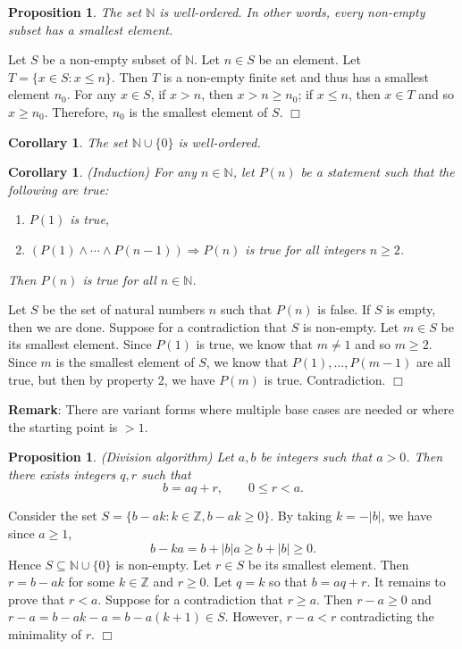 \documentclass{article}
\def\Z{{\mathbb Z}}
\def\N{{\mathbb N}}
\def\Z{{\mathbb Z}}
\newtheorem{cor}[subsection]{Corollary}
\newtheorem{proposition}[subsection]{Proposition}
\newenvironment{proof}{\noindent {\bf Proof:}}{$\Box$ \vspace{2 ex}}
\begin{document}
\begin{proposition}
The set $\N$ is well-ordered. In other words, every non-empty subset has a smallest element.
\end{proposition}

\begin{proof}
    Let $S$ be a non-empty subset of $\N$. Let $n\in S$ be an element. Let $T = \{x\in S\colon x \leq n\}$. Then $T$ is a non-empty finite set and thus has a smallest element $n_0$. For any $x\in S$, if $x>n$, then $x>n\geq n_0$; if $x\leq n$, then $x\in T$ and so $x\geq n_0$. Therefore, $n_0$ is the smallest element of $S$.
\end{proof}

\begin{cor}
The set $\N\cup\{0\}$ is well-ordered.
\end{cor}

\begin{cor}
    (Induction) For any $n\in\N$, let $P(n)$ be a statement such that the following are true:
    \begin{enumerate}
        \item $P(1)$ is true,
        \item $(P(1)\wedge\cdots\wedge P(n-1))\Rightarrow P(n)$ is true for all integers $n\geq2$.
    \end{enumerate}
    Then $P(n)$ is true for all $n\in\N$.
\end{cor}

\begin{proof}
    Let $S$ be the set of natural numbers $n$ such that $P(n)$ is false. If $S$ is empty, then we are done. Suppose for a contradiction that $S$ is non-empty. Let $m\in S$ be its smallest element. Since $P(1)$ is true, we know that $m\neq 1$ and so $m\geq2$. Since $m$ is the smallest element of $S$, we know that $P(1),\ldots,P(m-1)$ are all true, but then by property 2, we have $P(m)$ is true. Contradiction.
\end{proof}

\noindent\textbf{Remark}: There are variant forms where multiple base cases are needed or where the starting point is $>1$.

\begin{proposition}
    (Division algorithm) Let $a,b$ be integers such that $a>0$. Then there exists integers $q,r$ such that $$b = aq + r,\qquad 0\leq r < a.$$
\end{proposition}

\begin{proof}
    Consider the set $S = \{b - ak\colon k\in\Z, b - ak\geq 0\}$. By taking $k = -|b|$, we have since $a\geq 1$,
    $$b - ka = b + |b|a \geq b + |b| \geq 0.$$
    Hence $S\subseteq \N\cup\{0\}$ is non-empty. Let $r\in S$ be its smallest element. Then $r = b - ak$ for some $k\in\Z$ and $r\geq0$. Let $q = k$ so that $b = aq + r$. It remains to prove that $r < a$. Suppose for a contradiction that $r\geq a$. Then $r-a\geq0$ and $r-a = b-ak-a = b-a(k+1)\in S$. However, $r-a < r$ contradicting the minimality of $r$.
\end{proof}
\end{document}
